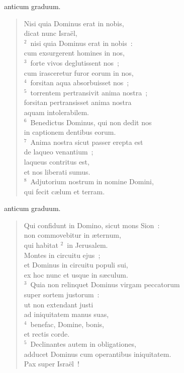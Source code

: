 \bchapter
{}anticum graduum. \begin{flushleft}\begin{verse}\vspace{6pt}Nisi quia Dominus erat in nobis,\\ dicat nunc Isra\"el,\\
${}^{2}$~nisi quia Dominus erat in nobis~:\\ cum exsurgerent homines in nos,\\
${}^{3}$~forte vivos deglutissent nos~;\\ cum irasceretur furor eorum in nos,\\
${}^{4}$~forsitan aqua absorbuisset nos~;\\
${}^{5}$~torrentem pertransivit anima nostra~;\\ forsitan pertransisset anima nostra\\ aquam intolerabilem.\\
${}^{6}$~Benedictus Dominus, qui non dedit nos\\ in captionem dentibus eorum.\\
${}^{7}$~Anima nostra sicut passer erepta est\\ de laqueo venantium~;\\ laqueus contritus est,\\ et nos liberati sumus.\\
${}^{8}$~Adjutorium nostrum in nomine Domini,\\ qui fecit c\ae lum et terram.\end{verse}\end{flushleft}



\bchapter
{}anticum graduum. \begin{flushleft}\begin{verse}\vspace{6pt}Qui confidunt in Domino, sicut mons Sion~:\\ non commovebitur in \ae ternum,\\ qui habitat
${}^{2}$~in Jerusalem.\\ Montes in circuitu ejus~;\\ et Dominus in circuitu populi sui,\\ ex hoc nunc et usque in s\ae culum.\\
${}^{3}$~Quia non relinquet Dominus virgam peccatorum\\ super sortem justorum~:\\ ut non extendant justi\\ ad iniquitatem manus suas,\\
${}^{4}$~benefac, Domine, bonis,\\ et rectis corde.\\
${}^{5}$~Declinantes autem in obligationes,\\ adducet Dominus cum operantibus iniquitatem.\\ Pax super Isra\"el~!\end{verse}\end{flushleft}



